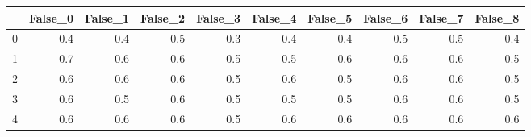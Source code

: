 \begin{tabular}{lrrrrrrrrr}
\toprule
{} &  False\_0 &  False\_1 &  False\_2 &  False\_3 &  False\_4 &  False\_5 &  False\_6 &  False\_7 &  False\_8 \\ \hline
\midrule
0 &      0.4 &      0.4 &      0.5 &      0.3 &      0.4 &      0.4 &      0.5 &      0.5 &      0.4 \\ \hline
1 &      0.7 &      0.6 &      0.6 &      0.5 &      0.5 &      0.6 &      0.6 &      0.6 &      0.5 \\ \hline
2 &      0.6 &      0.6 &      0.6 &      0.5 &      0.6 &      0.5 &      0.6 &      0.6 &      0.5 \\ \hline
3 &      0.6 &      0.5 &      0.6 &      0.5 &      0.5 &      0.5 &      0.6 &      0.6 &      0.5 \\ \hline
4 &      0.6 &      0.6 &      0.6 &      0.5 &      0.6 &      0.6 &      0.6 &      0.6 &      0.6 \\ \hline
\bottomrule
\end{tabular}
